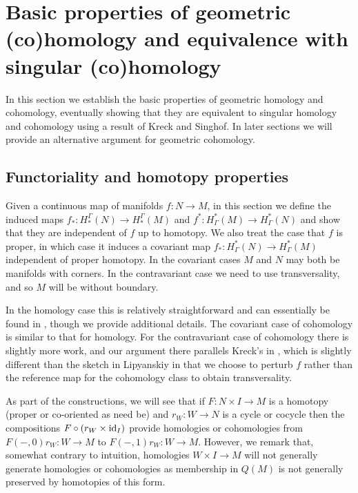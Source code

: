 
\section{Basic properties of geometric (co)homology and equivalence with singular (co)homology}\label{S: basic properties}

In this section we establish the basic properties of geometric homology and cohomology, eventually showing that they are equivalent to singular homology and cohomology using a result of Kreck and Singhof.
In later sections we will provide an alternative argument for geometric cohomology.

\subsection{Functoriality and homotopy properties}\label{S: functoriality}

Given a continuous map of manifolds $f \colon N \to M$, in this section we define the induced maps $f_* \colon H_*^\Gamma(N) \to H_*^\Gamma(M)$ and $f^* \colon H^*_\Gamma(M) \to H^*_\Gamma(N)$ and show that they are independent of $f$ up to homotopy.
We also treat the case that $f$ is proper, in which case it induces a covariant map $f_* \colon H^*_\Gamma(N) \to H^*_\Gamma(M)$ independent of proper homotopy.
In the covariant cases $M$ and $N$ may both be manifolds with corners.
In the contravariant case we need to use transversality, and so $M$ will be without boundary.

In the homology case this is relatively straightforward and can essentially be found in \cite[Section 6]{Lipy14}, though we provide additional details.
The covariant case of cohomology is similar to that for homology.
For the contravariant case of cohomology there is slightly more work, and our argument there parallels Kreck's in \cite{Krec10}, which is slightly different than the sketch in Lipyanskiy \cite[Section 6]{Lipy14} in that we choose to perturb $f$ rather than the reference map for the cohomology class to obtain transversality.

As part of the constructions, we will see that if $F \colon N \times I \to M$ is a homotopy (proper or co-oriented as need be) and $r_W \colon W \to N$ is a cycle or cocycle then the compositions $F \circ (r_W \times \mathrm{id}_I)$ provide homologies or cohomologies from $F(-,0)r_W \colon W \to M$ to $F(-,1)r_W \colon W \to M$.
However, we remark that, somewhat contrary to intuition, homologies $W \times I \to M$ will not generally generate homologies or cohomologies as membership in $Q(M)$ is not generally preserved by homotopies of this form.

